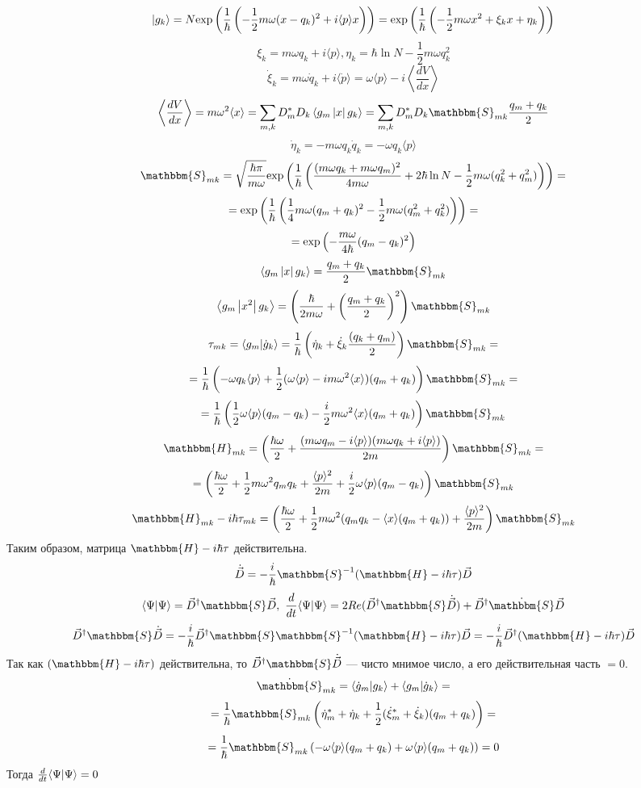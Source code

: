 $$|g_k\rangle = N\myexp{\frac{1}{\hbar}\left(-\frac{1}{2}m\omega(x-q_k)^2+i\langle p\rangle x\right)} = %
		 \myexp{\frac{1}{\hbar}\left(-\frac{1}{2}m\omega x^2 + \xi_k x + \eta_k\right)}$$
$$\xi_k = m\omega q_k + i\langle p\rangle, \eta_k = \hbar\ln N - \frac{1}{2}m\omega q_k^2$$
$$\dot{\xi}_k = m\omega \dot{q}_k+i\langle\dot{p} \rangle = %
	         \omega\langle p\rangle - i\left\langle\frac{dV}{dx}\right\rangle$$
$$\left\langle\frac{dV}{dx}\right\rangle = %
  m\omega^2\langle x\rangle %
= \sum_{m,k}D_m^*D_k\mymean{g_m}{x}{g_k}=%
  \sum_{m,k}D_m^*D_k\mathbbm{S}_{mk}\frac{q_m+q_k}{2}$$
$$\dot{\eta}_k = -m\omega q_k\dot{q}_k = -\omega q_k\langle p\rangle$$
$$\mathbbm{S}_{mk}=\sqrt{\frac{\hbar\pi}{m\omega}}\myexp{\frac{1}{\hbar}\left(\frac{(m\omega q_k+m\omega q_m)^2}{4m\omega}+%
									      2\hbar\ln N-\frac{1}{2}m\omega(q_k^2+q_m^2)\right)}=$$
$$=\text{exp}\left( \frac{1}{\hbar}\left(\frac{1}{4}m\omega(q_m+q_k)^2-\frac{1}{2}m\omega(q_m^2+q_k^2)\right) \right)=$$
$$=\text{exp}\left( -\frac{m\omega}{4\hbar}(q_m-q_k)^2 \right)$$
$$\mymean{g_m}{x}{g_k}=\frac{q_m+q_k}{2}\mathbbm{S}_{mk}$$
$$\mymean{g_m}{x^2}{g_k}=\left(\frac{\hbar}{2m\omega}+\left(\frac{q_m+q_k}{2}\right)^2\right)\mathbbm{S}_{mk}$$
$$\tau_{mk} = \myint{g_m}{\dot{g}_k}=\frac{1}{\hbar}\left(\dot{\eta}_k+\dot{\xi}_k\frac{(q_k+q_m)}{2}\right)\mathbbm{S}_{mk}=$$
$$=\frac{1}{\hbar}\left(-\omega q_k\langle p\rangle+\frac{1}{2}(\omega\langle p\rangle-im\omega^2\langle x\rangle)(q_m+q_k)\right)\mathbbm{S}_{mk}=$$
$$=\frac{1}{\hbar}\left(\frac{1}{2}\omega\langle p\rangle(q_m-q_k) - \frac{i}{2}m\omega^2\langle x\rangle(q_m+q_k)\right)\mathbbm{S}_{mk}$$
$$\mathbbm{H}_{mk} = \left(\frac{\hbar\omega}{2}+\frac{(m\omega q_m-i\langle p\rangle)(m\omega q_k+i\langle p\rangle)}{2m}\right)\mathbbm{S}_{mk}=$$
$$=\left(\frac{\hbar\omega}{2}+\frac{1}{2}m\omega^2 q_mq_k+\frac{\langle p\rangle^2}{2m}+\frac{i}{2}\omega\langle p\rangle(q_m-q_k)\right)\mathbbm{S}_{mk}$$
$$\mathbbm{H}_{mk}-i\hbar\tau_{mk}=\left(\frac{\hbar\omega}{2}+\frac{1}{2}m\omega^2(q_mq_k-\langle x\rangle(q_m+q_k))+\frac{\langle p\rangle^2}{2m}\right)\mathbbm{S}_{mk}$$
Таким образом, матрица $\mathbbm{H}-i\hbar\tau$ действительна.
$$\dot{\vec{D}}=-\frac{i}{\hbar}\mathbbm{S}^{-1}(\mathbbm{H}-i\hbar\tau)\vec{D}$$
$$\myint{\Psi}{\Psi}=\vec{D}^{\dagger}\mathbbm{S}\vec{D},\ %
  \frac{d}{dt}\myint{\Psi}{\Psi}=2Re(\vec{D}^{\dagger}\mathbbm{S}\dot{\vec{D}})+\vec{D}^{\dagger}\dot{\mathbbm{S}}\vec{D}$$
$$\vec{D}^{\dagger}\mathbbm{S}\dot{\vec{D}}=%
  -\frac{i}{\hbar}\vec{D}^{\dagger}\mathbbm{S}\mathbbm{S}^{-1}(\mathbbm{H}-i\hbar\tau)\vec{D}=%
  -\frac{i}{\hbar}\vec{D}^{\dagger}(\mathbbm{H}-i\hbar\tau)\vec{D}$$
Так как $(\mathbbm{H}-i\hbar\tau)$ действительна, то $\vec{D}^{\dagger}\mathbbm{S}\dot{\vec{D}}$ --- чисто мнимое число, а его действительная часть $=0$.
$$\dot{\mathbbm{S}}_{mk}= \myint{\dot{g}_m}{g_k}+\myint{g_m}{\dot{g}_k}=$$
$$=\frac{1}{\hbar}\mathbbm{S}_{mk}\left(\dot{\eta}_m^*+\dot{\eta}_k+\frac{1}{2}(\dot{\xi}_m^*+\dot{\xi}_k)(q_m+q_k)\right)=$$
$$=\frac{1}{\hbar}\mathbbm{S}_{mk}\left(-\omega\langle p\rangle(q_m+q_k)+\omega\langle p\rangle(q_m+q_k)\right)=0$$
Тогда $\frac{d}{dt}\langle \Psi | \Psi \rangle = 0$

